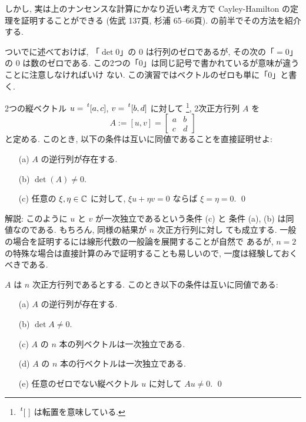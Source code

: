 \documentclass[12pt,twoside]{jarticle}
\begin{document}
しかし, 実は上のナンセンスな計算にかなり近い考え方で 
Cayley-Hamilton の定理を証明することができる
(佐武 \cite{satake} 137頁, 杉浦 \cite{sugiura} 65--66頁).
 の前半でその方法を紹介する.

ついでに述べておけば, 「$\det 0$」の $0$ は行列のゼロであるが, 
その次の「$= 0$」の $0$ は数のゼロである.
この2つの「$0$」は同じ記号で書かれているが意味が違うことに注意しなければいけ
ない.  この演習ではベクトルのゼロも単に「$0$」と書く.


\begin{question}[5点]
  2つの縦ベクトル %
  $u=\tp{[a, c]}$, $v=\tp{[b, d]}$ に対して%
  \footnote{$\tp{[\ ]}$ は転置を意味している.}, 2次正方行列 $A$ を
  \begin{equation*}
    A := [u, v] = \begin{bmatrix} a & b \\ c & d \end{bmatrix}
  \end{equation*}
  と定める. このとき, 以下の条件は互いに同値であることを直接証明せよ:
  \begin{enumerate}
  \item[(a)] $A$ の逆行列が存在する.
  \item[(b)] $\det(A) \ne 0$.
  \item[(c)] 任意の $\xi,\eta\in{\mathbb C}$ に対して, %
    $\xi u + \eta v = 0$ ならば $\xi = \eta = 0$.
  \qed
  \end{enumerate}
\end{question}

\noindent 
解説: このように $u$ と $v$ が一次独立であるという条件 (c) と
条件 (a), (b) は同値なのである. もちろん, 同様の結果が $n$ 次正方行列に対し
ても成立する. 一般の場合を証明するには線形代数の一般論を展開することが自然で
あるが, $n=2$ の特殊な場合は直接計算のみで証明することも易しいので, 
一度は経験しておくべきである.


\begin{question}[15点]\label{q:det-nxn}
  $A$ は $n$ 次正方行列であるとする. このとき以下の条件は互いに同値である:
  \begin{enumerate}
  \item[(a)] $A$ の逆行列が存在する.
  \item[(b)] $\det A \ne 0$.
  \item[(c)] $A$ の $n$ 本の列ベクトルは一次独立である.
  \item[(d)] $A$ の $n$ 本の行ベクトルは一次独立である.
  \item[(e)] 任意のゼロでない縦ベクトル $u$ に対して $Au\ne0$.
    \qed
  \end{enumerate}
\end{question}
\end{document}
